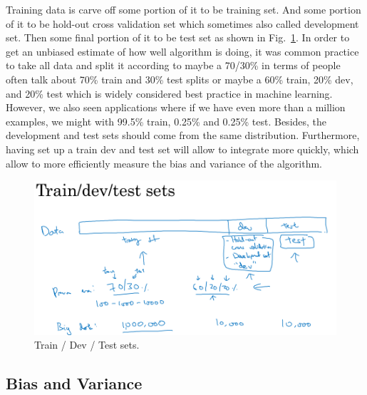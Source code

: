\documentclass[a4paper]{article}
\begin{document}
Training data is carve off some portion of it to be training set. And some portion of it to be hold-out cross validation set which sometimes also called development set. Then some final portion of it to be test set as shown in Fig.~\ref{p6}. In order to get an unbiased estimate of how well algorithm is doing, it was common practice to take all data and split it according to maybe a 70/30\% in terms of people often talk about 70\% train and 30\% test splits or maybe a 60\% train, 20\% dev, and 20\% test which is widely considered best practice in machine learning. However, we also seen applications where if we have even more than a million examples, we might with 99.5\% train, 0.25\% and 0.25\% test. Besides, the development and test sets should come from the same distribution. Furthermore, having set up a train dev and test set will allow to integrate more quickly, which allow to more efficiently measure the bias and variance of the algorithm.
\begin{figure}
	\begin{center}
		\includegraphics[scale=0.3]{figures/7.png}
	\end{center}
	\caption{Train / Dev / Test sets.}
	\label{p6}
\end{figure}

\subsection{Bias and Variance}
\end{document}
